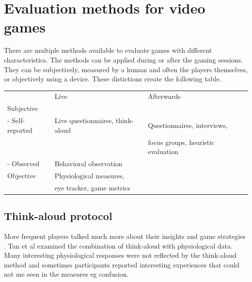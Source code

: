 \chapter{Evaluation methods for video games}
\label{ch:evaluationmethods}

There are multiple methods available to evaluate games with different characteristics. The methods can be applied during or after the gaming sessions. They can be subjectively, measured by a human and often the players themselves, or objectively using a device. These distictions create the following table.
 
\begin{table}[]
	\begin{tabular}{llll}
					& Live                                              & Afterwards\\
	Subjective      &                                                   & \\
	- Self-reported & Live questionnaires, think-aloud                  & Questionnaires, interviews,\\ 
					& 													& focus groups, heuristic evaluation \\
	- Observed      & Behavioral observation 							& \\
	Objective       & Physiological measures, 							& \\  
					& eye tracker, game metrics         				&\\                                                    
	\end{tabular}
\end{table}                                             								


\section{Think-aloud protocol}
More frequent players talked much more about their insights and game strategies \cite{blumberg2008impasse}.
Tan et al examined the combination of think-aloud with physiological data. Many interesting physiological responses were not reflected by the think-aloud method and sometimes participants reported interesting experiences that could not me seen in the measures eg confusion.

